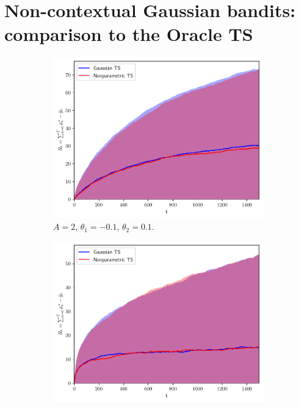 \section{Non-contextual Gaussian bandits: comparison to the Oracle TS}
\label{asec:noncontextual_gaussian_bandits}

\begin{figure}[!h]
	\centering
	\begin{subfigure}[b]{0.32\textwidth}
		\includegraphics[width=\textwidth]{./figs/staticGaussian/cumregret_A2_-01_01_1_1}
		\vspace*{-5ex}
		\caption{$A=2$, $\theta_{1}=-0.1$, $\theta_{2}=0.1$.}
		\label{afig:static_gaussian_A2_01}
	\end{subfigure}
	\begin{subfigure}[b]{0.32\textwidth}
		\includegraphics[width=\textwidth]{./figs/staticGaussian/cumregret_A2_-05_05_1_1}

\end{subfigure}
\end{figure}
